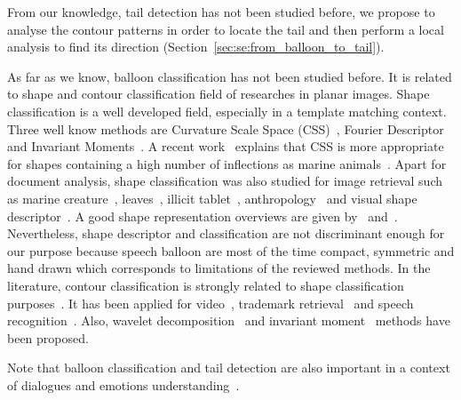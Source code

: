 From our knowledge, tail detection has not been studied before, we propose to analyse the contour patterns in order to locate the tail and then perform a local analysis to find its direction (Section~\ref{sec:se:from_balloon_to_tail}).

As far as we know, balloon classification has not been studied before.
It is related to shape and contour classification field of researches in planar images.
Shape classification is a well developed field, especially in a template matching context.
Three well know methods are Curvature Scale Space (CSS)~\cite{Abbasi1999}, Fourier Descriptor~\cite{Zahn1972} and Invariant Moments~\cite{Hu1962}.
A recent work~\cite{Lopatka2013} explains that CSS is more appropriate for shapes containing a high number of inflections as marine animals~\cite{Abbasi1999}.
Apart for document analysis, shape classification was also studied for image retrieval such as marine creature~\cite{Mokhtarian2002}, leaves~\cite{Wang2003}, illicit tablet~\cite{Lopatka2013}, anthropology~\cite{Keogh2006} and visual shape descriptor~\cite{Bober01}. A good shape representation overviews are given by~\cite{veltkamp2000} and~\cite{Zhang2004}. 
Nevertheless, shape descriptor and classification are not discriminant enough for our purpose because speech balloon are most of the time compact, symmetric and hand drawn which corresponds to limitations of the reviewed methods.
In the literature, contour classification is strongly related to shape classification purposes~\cite{sun2005classification,liu1990partial}.
It has been applied for video~\cite{kuhne2001motion,richter2001contour,bader2009}, trademark retrieval~\cite{leung2002trademark} and speech recognition~\cite{grigoriu1994automatic}. 
Also, wavelet decomposition~\cite{Cenkery1996} and invariant moment~\cite{mukundan1998moment} methods have been proposed.

Note that balloon classification and tail detection are also important in a context of dialogues and emotions understanding~\cite{millidge2009comic}.





